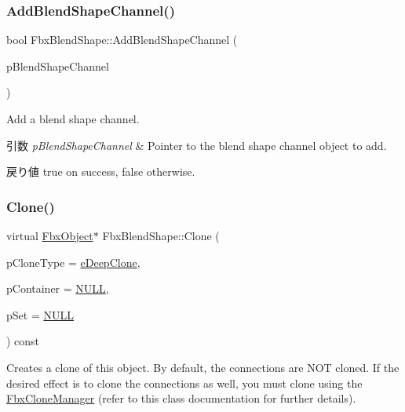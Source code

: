 \subsubsection{\texorpdfstring{Add\+Blend\+Shape\+Channel()}{AddBlendShapeChannel()}}
{\footnotesize\ttfamily bool Fbx\+Blend\+Shape\+::\+Add\+Blend\+Shape\+Channel (\begin{DoxyParamCaption}\item[{\hyperlink{class_fbx_blend_shape_channel}{Fbx\+Blend\+Shape\+Channel} $\ast$}]{p\+Blend\+Shape\+Channel }\end{DoxyParamCaption})}

Add a blend shape channel. 
\begin{DoxyParams}{引数}
{\em p\+Blend\+Shape\+Channel} & Pointer to the blend shape channel object to add. \\
\hline
\end{DoxyParams}
\begin{DoxyReturn}{戻り値}
{\ttfamily true} on success, {\ttfamily false} otherwise. 
\end{DoxyReturn}
\mbox{\label{class_fbx_blend_shape_aea5560eb695574977b5e7b8d0387d81a}} 
\subsubsection{\texorpdfstring{Clone()}{Clone()}}
{\footnotesize\ttfamily virtual \hyperlink{class_fbx_object}{Fbx\+Object}$\ast$ Fbx\+Blend\+Shape\+::\+Clone (\begin{DoxyParamCaption}\item[{\hyperlink{class_fbx_object_a9f5626b2d2135684d6ea1e6e4ad2acbb}{Fbx\+Object\+::\+E\+Clone\+Type}}]{p\+Clone\+Type = {\ttfamily \hyperlink{class_fbx_object_a9f5626b2d2135684d6ea1e6e4ad2acbbaacdf137ca059c572798287e98c4236d0}{e\+Deep\+Clone}},  }\item[{\hyperlink{class_fbx_object}{Fbx\+Object} $\ast$}]{p\+Container = {\ttfamily \hyperlink{fbxarch_8h_a070d2ce7b6bb7e5c05602aa8c308d0c4}{N\+U\+LL}},  }\item[{void $\ast$}]{p\+Set = {\ttfamily \hyperlink{fbxarch_8h_a070d2ce7b6bb7e5c05602aa8c308d0c4}{N\+U\+LL}} }\end{DoxyParamCaption}) const\hspace{0.3cm}{\ttfamily [virtual]}}

Creates a clone of this object. By default, the connections are N\+OT cloned. If the desired effect is to clone the connections as well, you must clone using the \hyperlink{class_fbx_clone_manager}{Fbx\+Clone\+Manager} (refer to this class documentation for further details).



